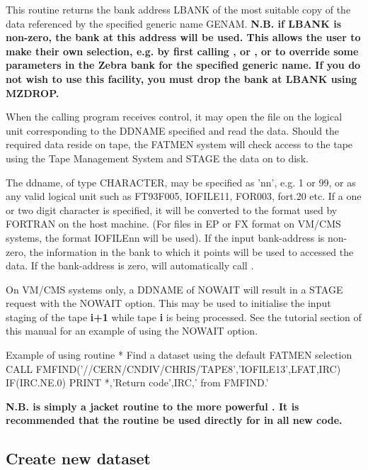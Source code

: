 This routine returns the bank address LBANK of the most
suitable copy of the data referenced by the specified
generic name GENAM.
{\bf N.B. if LBANK is non-zero, the bank at this address
will be used. This allows the user to make their own
selection, e.g. by first calling ,  or , or to override
some parameters in the Zebra bank for the specified generic name.
If you do not wish to use this facility, you must drop the
bank at LBANK using MZDROP.}

When the calling program receives control, it may open the file on
the logical unit corresponding to the DDNAME
specified and read the data.
Should the required data reside on
tape, the FATMEN system will check access to the tape using the Tape
Management System and STAGE the data on to disk.

The ddname, of type CHARACTER, may be specified as 'nn', e.g. 1
or 99, or as any valid logical unit such as FT93F005, IOFILE11, FOR003,
fort.20 etc.
If a one or two digit character is specified, it will be
converted to the format used by FORTRAN on the host machine.
(For files in EP or FX format on VM/CMS systems, the format IOFILEnn will
be used).
If the input bank-address is non-zero, the information in the
bank to which it points
will be used to accessed the data. If the bank-address is zero,
 will automatically call .

On VM/CMS systems only, a DDNAME of NOWAIT will result in a
STAGE request with the NOWAIT option. This may be used to
initialise the input staging of the tape {\bf i+1}
while tape {\bf i} is being processed. See the tutorial section
of this manual for an example of using the NOWAIT option.
\begin{XMPt} {Example of using routine \protect{}}
*     Find a dataset using the default FATMEN selection
      CALL FMFIND('//CERN/CNDIV/CHRIS/TAPE8','IOFILE13',LFAT,IRC)
      IF(IRC.NE.0) PRINT *,'Return code',IRC,' from FMFIND.'
\end{XMPt}

{\bf N.B.  is simply a jacket routine to the
more powerful . It is recommended that the
routine  be used directly for in all new code.}

\subsection{Create new dataset}

